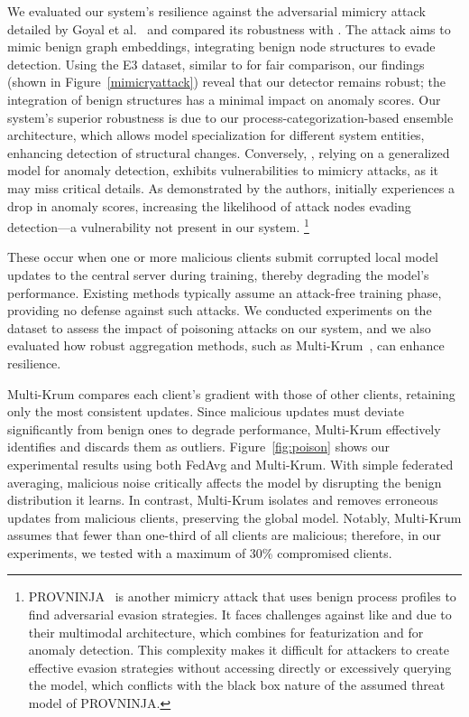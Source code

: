   We evaluated our system's resilience against the adversarial mimicry attack detailed by Goyal et al.~\cite{goyal2023sometimes} and compared its robustness with \flash. The attack aims to mimic benign graph embeddings, integrating benign node structures to evade detection. Using the E3 dataset, similar to \flash for fair comparison, our findings (shown in Figure~\ref{mimicryattack}) reveal that our detector remains robust; the integration of benign structures has a minimal impact on anomaly scores. Our system's superior robustness is due to our process-categorization-based ensemble \gnnshort architecture, which allows model specialization for different system entities, enhancing detection of structural changes. Conversely, \flash, relying on a generalized model for anomaly detection, exhibits vulnerabilities to mimicry attacks, as it may miss critical details. As demonstrated by the authors, \flash initially experiences a drop in anomaly scores, increasing the likelihood of attack nodes evading detection—a vulnerability not present in our system. \footnote{PROVNINJA~\cite{mukherjee2023evading} is another mimicry attack that uses benign process profiles to find adversarial evasion strategies. It faces challenges against \pids like \flash and \Sys due to their multimodal architecture, which combines \wordvec for featurization and \gnnshort for anomaly detection. This complexity makes it difficult for attackers to create effective evasion strategies without accessing \wordvec directly or excessively querying the model, which conflicts with the black box nature of the assumed threat model of PROVNINJA.}


 These occur when one or more malicious clients submit corrupted local model updates to the central server during training, thereby degrading the model’s performance. Existing methods typically assume an attack-free training phase, providing no defense against such attacks. We conducted experiments on the \optc dataset to assess the impact of poisoning attacks on our system, and we also evaluated how robust aggregation methods, such as Multi-Krum~\cite{munoz2019byzantine}, can enhance resilience.

Multi-Krum compares each client’s gradient with those of other clients, retaining only the most consistent updates. Since malicious updates must deviate significantly from benign ones to degrade performance, Multi-Krum effectively identifies and discards them as outliers. Figure~\ref{fig:poison} shows our experimental results using both FedAvg and Multi-Krum. With simple federated averaging, malicious noise critically affects the model by disrupting the benign distribution it learns. In contrast, Multi-Krum isolates and removes erroneous updates from malicious clients, preserving the global model. Notably, Multi-Krum assumes that fewer than one-third of all clients are malicious; therefore, in our experiments, we tested with a maximum of 30\% compromised clients.



